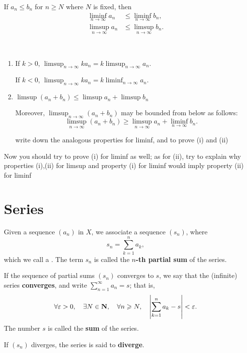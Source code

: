 \begin{proposition}\label{prop:limsup-liminf-comp}
If $a_n\le b_n$ for $n\ge N$ where $N$ is fixed, then
\begin{align*}
\liminf_{n\to\infty}a_n&\le\liminf_{n\to\infty}b_n,\\
\limsup_{n\to\infty}a_n&\le\limsup_{n\to\infty}b_n.
\end{align*}
\end{proposition}

\begin{proposition} \
\begin{enumerate}[label=(\arabic*)]
\item If $k>0$, $\displaystyle\limsup_{n\to\infty}ka_n=k\limsup_{n\to\infty}a_n$.

If $k<0$, $\displaystyle\limsup_{n\to\infty}ka_n=k\liminf_{n\to\infty}a_n$.

\item $\displaystyle\limsup(a_n+b_n)\le\limsup a_n+\limsup b_n$

Moreover, $\displaystyle\limsup_{n\to\infty}(a_n+b_n)$ may be bounded from below as follows:
\[ \limsup_{n\to\infty}(a_n+b_n)\ge\limsup_{n\to\infty}a_n+\liminf_{n\to\infty}b_n.\]

write down the analogous properties for liminf, and to prove (i) and (ii)
\end{enumerate}
\end{proposition}

Now you should try to prove (i) for liminf as well; as for (ii), try to explain why properties (i),(ii) for limsup and property (i) for liminf would imply property (ii) for liminf

\section{Series}
\begin{definition}[Series]
Given a sequence $(a_n)$ in $X$, we associate a sequence $(s_n)$, where
\[s_n=\sum_{k=1}^n a_k,\]
which we call a . The term $s_n$ is called the \textbf{$n$-th partial sum} of the series.

If the sequence of partial sums $(s_n)$ converges to $s$, we say that the (infinite) series \textbf{converges}, and write $\displaystyle\sum_{n=1}^\infty a_n=s$; that is,
\[\forall\varepsilon>0,\quad\exists N\in\mathbf N,\quad\forall n\geqslant N,\quad\left|\sum_{k=1}^n a_k-s\right|<\varepsilon.\]
The number $s$ is called the \textbf{sum} of the series.

If $(s_n)$ diverges, the series is said to \textbf{diverge}.
\end{definition}

